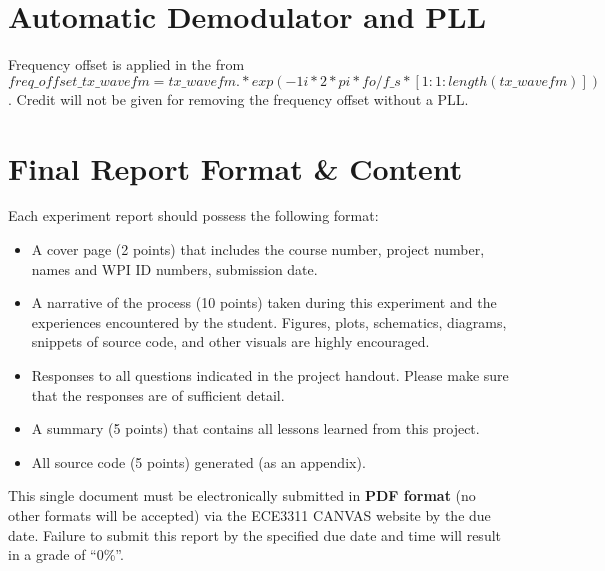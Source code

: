 \documentclass[letterpaper,12pt]{article}
\begin{document}

\section{Automatic Demodulator and PLL}



Frequency offset is applied in the from $freq\_offset\_tx\_wavefm = tx\_wavefm.*exp(-1i*2*pi*fo/f\_s*[1:1:length(tx\_wavefm)])$. Credit will not be given for removing the frequency offset without a PLL.


\section{Final Report Format \& Content}

Each experiment report should possess the following format:
\begin{itemize}
 \item A cover page (2 points) that includes the course number, project number, names and WPI ID numbers, submission date.
 \item A narrative of the process (10 points) taken during this experiment and the experiences encountered by the student.  Figures, plots, schematics, diagrams, snippets of source code, and other visuals are highly encouraged.
 \item Responses to all questions indicated in the project handout.   Please make sure that the responses are of sufficient detail.
 \item A summary (5 points) that contains all lessons learned from this project.
 \item All source code (5 points) generated (as an appendix).
\end{itemize}

This single document must be electronically submitted in {\bf PDF format} (no other formats will be accepted) via the ECE3311 CANVAS website by the due date. Failure to submit this report by the specified due date and time will result in a grade of ``0\%''.
\end{document}
